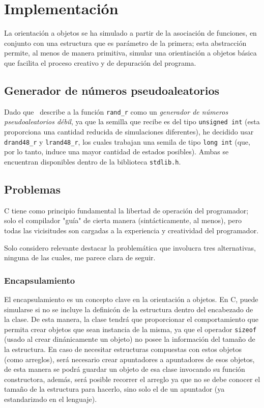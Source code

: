 \documentclass[a4paper]{report}
\begin{document}
  \chapter{Implementaci\'on}
  La orientaci\'on a objetos se ha simulado a partir de la asociaci\'on de funciones, en
  conjunto con una estructura que es par\'ametro de la primera; esta abstracci\'on permite,
  al menos de manera primitiva, simular una orientiaci\'on a objetos b\'asica que facilita
  el proceso creativo y de depuraci\'on del programa.

  \section{Generador de n\'umeros pseudoaleatorios}

  Dado que~\cite{rand_r} describe a la funci\'on \texttt{rand\_r} como un \textit{generador de
    n\'umeros pseudoaleatorios d\'ebil}, ya que la semilla que recibe es del tipo
  \texttt{unsigned int} (esta proporciona una cantidad reducida de simulaciones
  diferentes), he decidido usar \texttt{drand48\_r} y \texttt{lrand48\_r}, los cuales trabajan
  una semila de tipo \texttt{long int} (que, por lo tanto, induce una mayor cantidad de estados
  posibles). Ambas se encuentran disponibles dentro de la biblioteca \texttt{stdlib.h}.

  \section{Problemas}
  C tiene como principio fundamental la libertad de operaci\'on del programador; solo el
  compilador "gu\'ia" de cierta manera (sint\'acticamente, al menos), pero todas las
  vicisitudes son cargadas a la experiencia y creatividad del programador.

  Solo considero relevante destacar la problem\'atica que involucra tres alternativas, ninguna
  de las cuales, me parece clara de seguir.

  \subsection{Encapsulamiento}
  El encapsulamiento es un concepto clave en la orientaci\'on a objetos. En C, puede simularse
  si no se incluye la definic\'on de la estructura dentro del encabezado de la clase. De esta
  manera, la clase tendr\'a que proporcionar el comportamiento que permita crear objetos que sean
  instancia de la misma, ya que el operador \texttt{sizeof} (usado al crear din\'anicamente un objeto)
  no posee la informaci\'on del tama\~no de la estructura. En caso de necesitar estructuras
  compuestas con estos objetos (como arreglos), ser\'a necesario crear apuntadores a apuntadores
  de esos objetos, de esta manera se podr\'a guardar un objeto de esa clase invocando
  su funci\'on constructora, adem\'as, ser\'a posible recorrer el arreglo ya que no se debe
  conocer el tama\~no de la estructura para hacerlo, sino solo el de un apuntador (ya estandarizado
  en el lenguaje).\\
\end{document}
